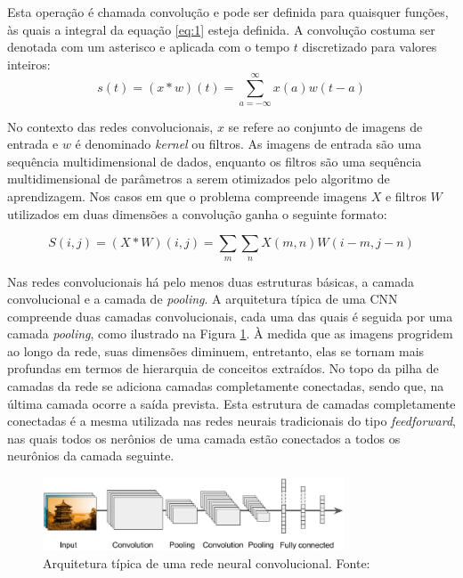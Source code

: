 Esta operação é chamada convolução e pode ser definida para quaisquer
funções, às quais a integral da equação \ref{eq:1} esteja definida. A convolução
costuma ser denotada com um asterisco e aplicada com o tempo $t$ discretizado para valores inteiros:
\begin{equation}
 s(t) = (x * w)(t) = \sum_{a=-\infty}^{\infty}{x(a)w(t-a)}
 \label{eq:2}
\end{equation}

No contexto das redes convolucionais, $x$ se refere ao conjunto de imagens de entrada 
e $w$ é denominado \textit{kernel} ou filtros. As imagens de entrada são uma sequência multidimensional 
de dados, enquanto os filtros são uma sequência multidimensional de parâmetros a serem 
otimizados pelo algoritmo de aprendizagem.
Nos casos em que o problema compreende imagens $X$ e filtros $W$ utilizados em duas dimensões 
a convolução ganha o seguinte formato:

\begin{equation}
 S(i,j) = (X*W)(i,j) = \sum_{m}\sum_{n}{X(m,n)W(i-m,j-n)}
\end{equation}

Nas redes convolucionais há pelo menos duas estruturas básicas, a camada convolucional e a camada de \textit{pooling}.
A arquitetura típica de uma CNN compreende duas camadas convolucionais, cada uma das quais é seguida por
uma camada \textit{pooling}, como ilustrado na Figura \ref{fig:cnn_basic_arq}. À medida que as imagens progridem
ao longo da rede, suas dimensões diminuem, entretanto, elas se tornam mais profundas
em termos de hierarquia de conceitos extraídos. No topo da pilha de camadas da rede
se adiciona camadas completamente conectadas, sendo que, na última camada ocorre a saída prevista.
Esta estrutura de camadas completamente conectadas é a mesma utilizada nas redes neurais tradicionais
do tipo \textit{feedforward}, nas quais todos os nerônios de uma camada estão conectados a todos os
neurônios da camada seguinte. 
\begin{figure}[htp]
\begin{center}
  \includegraphics[width=0.8\textwidth]{fig/cnn_basic_arq}
  \caption{Arquitetura típica de uma rede neural convolucional. Fonte:\cite{aurelien17}}
  \label{fig:cnn_basic_arq}
\end{center}
\end{figure}

